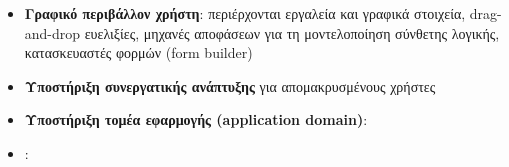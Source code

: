             \vspace{-0.5em}
            \begin{itemize}[label={\tiny \blacksquare}]
                \setlength\itemsep{-0.25em}
                \item \textbf{Γραφικό περιβάλλον χρήστη}: περιέρχονται εργαλεία και γραφικά στοιχεία, drag-and-drop ευελιξίες, μηχανές αποφάσεων για τη μοντελοποίηση σύνθετης λογικής, κατασκευαστές φορμών (form builder)
                \item \textbf{Υποστήριξη συνεργατικής ανάπτυξης} για απομακρυσμένους χρήστες
                \item \textbf{Υποστήριξη τομέα εφαρμογής (application domain)}: 
                \item \textbf{}:
            \end{itemize}
            \vspace{-0.5em}

        \cite{MDELow}